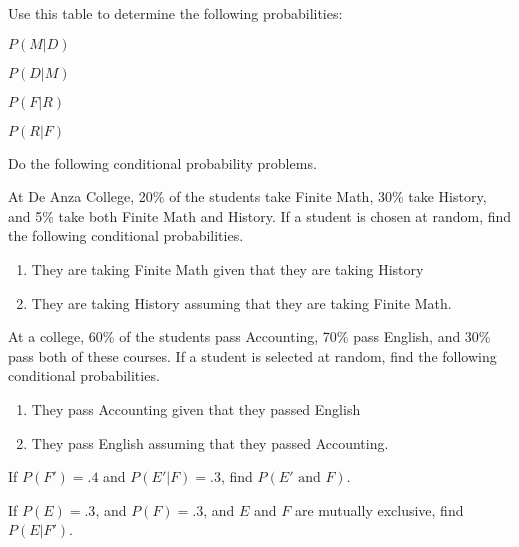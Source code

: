Use this table to determine the following probabilities:

\begin{puzzle}
    \( P(M | D) \)
\end{puzzle}

\begin{puzzle}
    \( P(D | M) \)
\end{puzzle}

\begin{puzzle}
    \( P(F | R) \)
\end{puzzle}

\begin{puzzle}
    \( P(R | F) \)
\end{puzzle}

Do the following conditional probability problems.

\begin{puzzle}
    At De Anza College, 20\% of the students take Finite Math, 30\% take History, and 5\% take both Finite Math and History. If a student is chosen at random, find the following conditional probabilities.
    \begin{enumerate}
        \item They are taking Finite Math given that they are taking History
        \item They are taking History assuming that they are taking Finite Math.
    \end{enumerate}
\end{puzzle}

\begin{puzzle}
    At a college, 60\% of the students pass Accounting, 70\% pass English, and 30\% pass both of these courses. If a student is selected at random, find the following conditional probabilities.
    \begin{enumerate}
        \item They pass Accounting given that they passed English
        \item They pass English assuming that they passed Accounting.
    \end{enumerate}
\end{puzzle}


\begin{puzzle}
    If \( P(F') = .4 \) and \( P(E' | F) = .3 \), find \( P(E' \text{ and } F) \).
\end{puzzle}

\begin{puzzle}
    If \( P(E) = .3 \), and \( P(F) = .3 \), and \( E \) and \( F \) are mutually exclusive, find \( P(E | F') \).
\end{puzzle}

